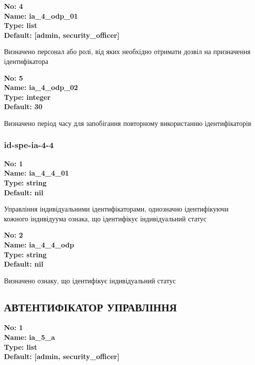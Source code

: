 \documentclass{article}
\begin{document}
{\footnotesize\bfseries
No: 4\\
Name: ia\_\allowbreak{}4\_\allowbreak{}odp\_\allowbreak{}01\\
Type: list\\
Default: [\textquotedbl{}admin\textquotedbl{}, \textquotedbl{}security\_\allowbreak{}officer\textquotedbl{}]
}

{\footnotesize Визначено персонал або ролі, від яких необхідно отримати дозвіл на призначення ідентифікатора}


{\footnotesize\bfseries
No: 5\\
Name: ia\_\allowbreak{}4\_\allowbreak{}odp\_\allowbreak{}02\\
Type: integer\\
Default: 30
}

{\footnotesize Визначено період часу для запобігання повторному використанню ідентифікаторів}




\subsubsection{id-spe-ia-4-4}


\vspace{10pt}
{\footnotesize\bfseries
No: 1\\
Name: ia\_\allowbreak{}4\_\allowbreak{}4\_\allowbreak{}01\\
Type: string\\
Default: nil
}

{\footnotesize Управління індивідуальними ідентифікаторами, однозначно ідентифікуючи кожного індивідуума ознака, що ідентифікує індивідуальний статус}


{\footnotesize\bfseries
No: 2\\
Name: ia\_\allowbreak{}4\_\allowbreak{}4\_\allowbreak{}odp\\
Type: string\\
Default: nil
}

{\footnotesize Визначено ознаку, що ідентифікує індивідуальний статус}




\subsection{АВТЕНТИФІКАТОР УПРАВЛІННЯ}


\vspace{10pt}
{\footnotesize\bfseries
No: 1\\
Name: ia\_\allowbreak{}5\_\allowbreak{}a\\
Type: list\\
Default: [\textquotedbl{}admin\textquotedbl{}, \textquotedbl{}security\_\allowbreak{}officer\textquotedbl{}]
}
\end{document}
